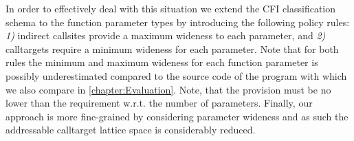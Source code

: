 In order to effectively deal with this situation we extend the CFI classification schema to the function parameter types by introducing the following 
policy rules: \textit{1)} indirect callsites provide a maximum wideness to each parameter, and
\textit{2)} calltargets require a minimum wideness for each parameter. Note that for both rules the minimum and maximum wideness for each function 
parameter is possibly underestimated compared to the source code of the program with which we also compare in \cref{chapter:Evaluation}.
Note, that the provision must be no lower than the requirement w.r.t. the number of parameters. 
Finally, our approach is more fine-grained by considering parameter wideness and as such the addressable 
calltarget lattice space is considerably reduced.



